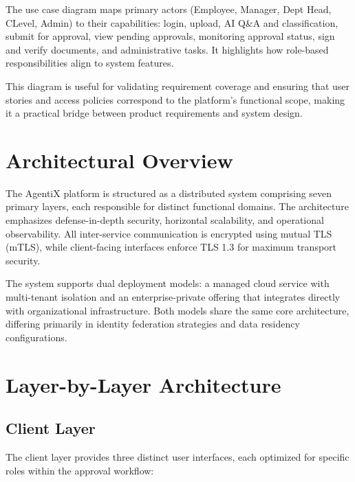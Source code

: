 \documentclass[12pt,oneside,openright,a4paper]{cpe-english-project}
\begin{document}
The use case diagram maps primary actors (Employee, Manager, Dept Head, C\-Level, Admin) to their capabilities: login, upload, AI Q\&A and classification, submit for approval, view pending approvals, monitoring approval status, sign and verify documents, and administrative tasks. It highlights how role-based responsibilities align to system features.

This diagram is useful for validating requirement coverage and ensuring that user stories and access policies correspond to the platform's functional scope, making it a practical bridge between product requirements and system design.

\newpage

\section{Architectural Overview}

The AgentiX platform is structured as a distributed system comprising seven primary layers, each responsible for distinct functional domains. The architecture emphasizes defense-in-depth security, horizontal scalability, and operational observability. All inter-service communication is encrypted using mutual TLS (mTLS), while client-facing interfaces enforce TLS 1.3 for maximum transport security.

The system supports dual deployment models: a managed cloud service with multi-tenant isolation and an enterprise-private offering that integrates directly with organizational infrastructure. Both models share the same core architecture, differing primarily in identity federation strategies and data residency configurations.

\vspace{1em}

\section{Layer-by-Layer Architecture}

\subsection{Client Layer}

The client layer provides three distinct user interfaces, each optimized for specific roles within the approval workflow:
\end{document}

